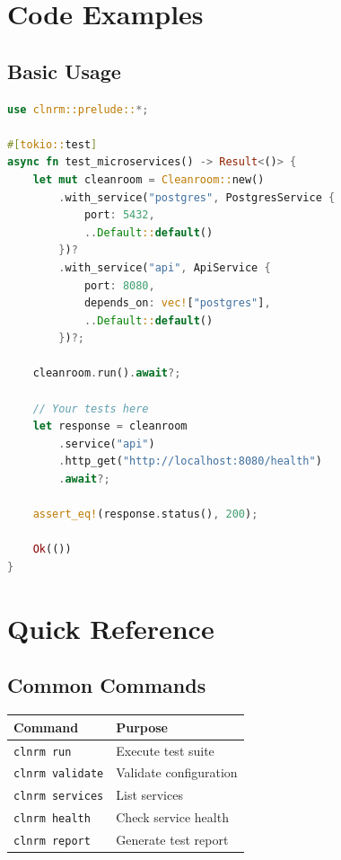 \documentclass[12pt,twoside,openright]{book}
\theoremstyle{plain}
\theoremstyle{definition}
\theoremstyle{remark}
\begin{document}
\begin{appendices}
\chapter{Code Examples}

\section{Basic Usage}

\begin{lstlisting}[language=Rust, caption=Basic CLNRM Usage]
use clnrm::prelude::*;

#[tokio::test]
async fn test_microservices() -> Result<()> {
    let mut cleanroom = Cleanroom::new()
        .with_service("postgres", PostgresService {
            port: 5432,
            ..Default::default()
        })?
        .with_service("api", ApiService {
            port: 8080,
            depends_on: vec!["postgres"],
            ..Default::default()
        })?;

    cleanroom.run().await?;

    // Your tests here
    let response = cleanroom
        .service("api")
        .http_get("http://localhost:8080/health")
        .await?;

    assert_eq!(response.status(), 200);

    Ok(())
}
\end{lstlisting}

\chapter{Quick Reference}

\section{Common Commands}

\begin{table}[H]
\centering
\begin{tabular}{|l|l|}
\hline
\textbf{Command} & \textbf{Purpose} \\
\hline
\texttt{clnrm run} & Execute test suite \\
\hline
\texttt{clnrm validate} & Validate configuration \\
\hline
\texttt{clnrm services} & List services \\
\hline
\texttt{clnrm health} & Check service health \\
\hline
\texttt{clnrm report} & Generate test report \\
\hline
\end{tabular}
\end{table}


\end{appendices}
\end{document}
